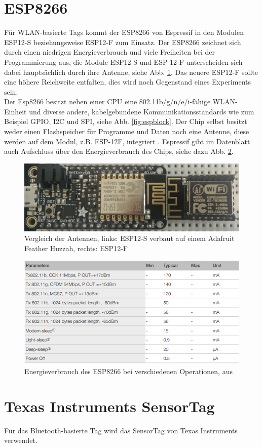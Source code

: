 \section{ESP8266}
Für WLAN-basierte Tags kommt der ESP8266 von Espressif in den Modulen ESP12-S beziehungsweise ESP12-F zum Einsatz.
Der ESP8266 zeichnet sich durch einen niedrigen Energieverbrauch und viele Freiheiten bei der Programmierung aus, die Module ESP12-S und ESP 12-F unterscheiden sich dabei hauptsächlich durch ihre Antenne, siehe Abb. \ref{fig:espmodules}.
Das neuere ESP12-F sollte eine höhere Reichweite entfalten, dies wird noch Gegenstand eines Experiments sein.\\
Der Esp8266 besitzt neben einer CPU eine 802.11b/g/n/e/i-fähige WLAN-Einheit und diverse andere, kabelgebundene Kommunikationsstandards wie zum Beispiel GPIO, I2C und SPI, siehe Abb. \ref{fig:espblock}.
Der Chip selbst besitzt weder einen Flashspeicher für Programme und Daten noch eine Antenne, diese werden auf dem Modul, z.B. ESP-12F, integriert \cite{espressif2017esp8266}.
Espressif gibt im Datenblatt auch Aufschluss über den Energieverbrauch des Chips, siehe dazu Abb. \ref{fig:esppower}.




\begin{figure}[h]
  \centering
	\includegraphics[width=\textwidth]{images/espmodules.png}
  \caption{Vergleich der Antennen, links: ESP12-S verbaut auf einem Adafruit Feather Huzzah, rechts: ESP12-F}
  \label{fig:espmodules}
\end{figure}

\begin{figure}[h]
  \centering
	\includegraphics[width=\textwidth]{images/esppower.png}
  \caption{Energieverbrauch des ESP8266 bei verschiedenen Operationen, aus \cite{espressif2017esp8266}}
  \label{fig:esppower}
\end{figure}

\section{Texas Instruments SensorTag}
Für das Bluetooth-basierte Tag wird das SensorTag von Texas Instruments verwendet.
